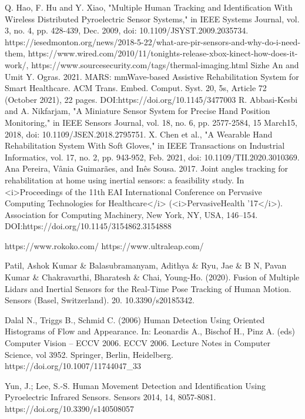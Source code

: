 \documentclass[conference]{IEEEtran}
\begin{document}
\begin{thebibliography}{00}
 Q. Hao, F. Hu and Y. Xiao, "Multiple Human Tracking and Identification With Wireless Distributed Pyroelectric Sensor Systems," in IEEE Systems Journal, vol. 3, no. 4, pp. 428-439, Dec. 2009, doi: 10.1109/JSYST.2009.2035734.
 https://iesedmonton.org/news/2018-5-22/what-are-pir-sensors-and-why-do-i-need-them, https://www.wired.com/2010/11/tonights-release-xbox-kinect-how-does-it-work/, https://www.sourcesecurity.com/tags/thermal-imaging.html
 Sizhe An and Umit Y. Ogras. 2021. MARS: mmWave-based Assistive Rehabilitation System for Smart Healthcare. ACM Trans. Embed. Comput. Syst. 20, 5s, Article 72 (October 2021), 22 pages. DOI:https://doi.org/10.1145/3477003
 R. Abbasi-Kesbi and A. Nikfarjam, "A Miniature Sensor System for Precise Hand Position Monitoring," in IEEE Sensors Journal, vol. 18, no. 6, pp. 2577-2584, 15 March15, 2018, doi: 10.1109/JSEN.2018.2795751.
 X. Chen et al., "A Wearable Hand Rehabilitation System With Soft Gloves," in IEEE Transactions on Industrial Informatics, vol. 17, no. 2, pp. 943-952, Feb. 2021, doi: 10.1109/TII.2020.3010369.
Ana Pereira, Vânia Guimarães, and Inês Sousa. 2017. Joint angles tracking for rehabilitation at home using inertial sensors: a feasibility study. In <i>Proceedings of the 11th EAI International Conference on Pervasive Computing Technologies for Healthcare</i> (<i>PervasiveHealth '17</i>). Association for Computing Machinery, New York, NY, USA, 146–154. DOI:https://doi.org/10.1145/3154862.3154888

 https://www.rokoko.com/
 https://www.ultraleap.com/

 Patil, Ashok Kumar \& Balasubramanyam, Adithya \& Ryu, Jae \& B N, Pavan Kumar \& Chakravarthi, Bharatesh \& Chai, Young-Ho. (2020). Fusion of Multiple Lidars and Inertial Sensors for the Real-Time Pose Tracking of Human Motion. Sensors (Basel, Switzerland). 20. 10.3390/s20185342. 


 Dalal N., Triggs B., Schmid C. (2006) Human Detection Using Oriented Histograms of Flow and Appearance. In: Leonardis A., Bischof H., Pinz A. (eds) Computer Vision – ECCV 2006. ECCV 2006. Lecture Notes in Computer Science, vol 3952. Springer, Berlin, Heidelberg. https://doi.org/10.1007/11744047\_33

 Yun, J.; Lee, S.-S. Human Movement Detection and Identification Using Pyroelectric Infrared Sensors. Sensors 2014, 14, 8057-8081. https://doi.org/10.3390/s140508057


\end{thebibliography}
\end{document}
